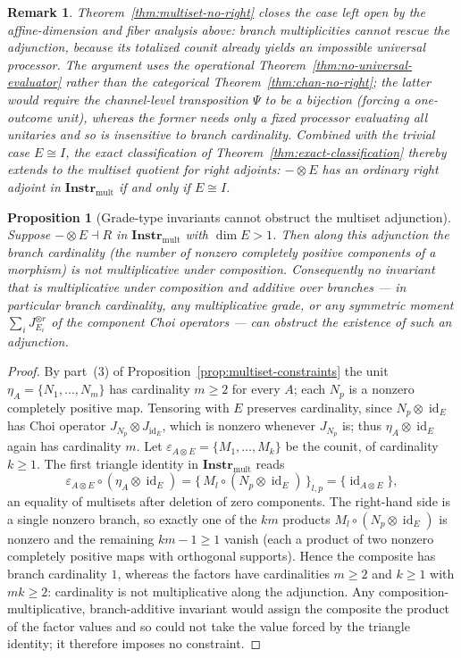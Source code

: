 \documentclass[11pt]{article}
\newtheorem{proposition}[theorem]{Proposition}
\newtheorem{remark}[theorem]{Remark}
\DeclareMathOperator{\id}{id}
\begin{document}
\begin{remark}
Theorem~\ref{thm:multiset-no-right} closes the case left open by the
affine-dimension and fiber analysis above: branch multiplicities cannot rescue
the adjunction, because its totalized counit already yields an impossible
universal processor. The argument uses the operational
Theorem~\ref{thm:no-universal-evaluator} rather than the categorical
Theorem~\ref{thm:chan-no-right}; the latter would require the channel-level
transposition $\Psi$ to be a bijection (forcing a one-outcome unit), whereas the
former needs only a fixed processor evaluating all unitaries and so is insensitive
to branch cardinality. Combined with the trivial case $E\cong I$, the exact
classification of Theorem~\ref{thm:exact-classification} thereby extends to the
multiset quotient for right adjoints:
$-\otimes E$ has an ordinary right adjoint in $\mathbf{Instr}_{\mathrm{mult}}$ if
and only if $E\cong I$.
\end{remark}

\begin{proposition}[Grade-type invariants cannot obstruct the multiset adjunction]
\label{prop:multiset-grade-selfdefeat}
Suppose $-\otimes E\dashv R$ in $\mathbf{Instr}_{\mathrm{mult}}$ with $\dim E>1$.
Then along this adjunction the branch cardinality (the number of nonzero
completely positive components of a morphism) is not multiplicative under
composition. Consequently no invariant that is multiplicative under composition
and additive over branches --- in particular branch cardinality, any
multiplicative grade, or any symmetric moment $\sum_i J_{E_i}^{\otimes r}$ of the
component Choi operators --- can obstruct the existence of such an adjunction.
\end{proposition}

\begin{proof}
By part~(3) of Proposition~\ref{prop:multiset-constraints} the unit
$\eta_A=\{N_1,\dots,N_m\}$ has cardinality $m\ge2$ for every $A$; each $N_p$ is a
nonzero completely positive map. Tensoring with $E$ preserves cardinality, since
$N_p\otimes\id_E$ has Choi operator $J_{N_p}\otimes J_{\id_E}$, which is nonzero
whenever $J_{N_p}$ is; thus $\eta_A\otimes\id_E$ again has cardinality $m$. Let
$\varepsilon_{A\otimes E}=\{M_1,\dots,M_k\}$ be the counit, of cardinality
$k\ge1$. The first triangle identity in $\mathbf{Instr}_{\mathrm{mult}}$ reads
\[
\varepsilon_{A\otimes E}\circ(\eta_A\otimes\id_E)
=\{\,M_l\circ(N_p\otimes\id_E)\,\}_{l,p}
=\{\id_{A\otimes E}\},
\]
an equality of multisets after deletion of zero components. The right-hand side
is a single nonzero branch, so exactly one of the $km$ products
$M_l\circ(N_p\otimes\id_E)$ is nonzero and the remaining $km-1\ge1$ vanish (each
a product of two nonzero completely positive maps with orthogonal supports).
Hence the composite has branch cardinality $1$, whereas the factors have
cardinalities $m\ge2$ and $k\ge1$ with $mk\ge2$: cardinality is not multiplicative
along the adjunction. Any composition-multiplicative, branch-additive invariant
would assign the composite the product of the factor values and so could not take
the value forced by the triangle identity; it therefore imposes no constraint.
\end{proof}
\end{document}
